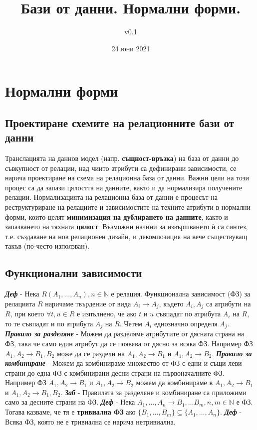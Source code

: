 \documentclass[fleqn,12pt]{article}
\title{Бази от данни. Нормални форми.}
\author{v0.1}
\date{24 юни 2021}
\begin{document}
\maketitle
\tableofcontents
\pagebreak


\section{Нормални форми}
\subsection{Проектиране схемите на релационните бази от данни}

Транслацията на даннов модел (напр. \textbf{същност-връзка}) на база от данни до съвкупност от релации, над чиито атрибути са дефинирани зависимости, се нарича проектиране на схема на релационна база от данни.
Важни цели на този процес са да запази цялостта на данните, както и да нормализира получените релации.
\bigbreak
Нормализацията на релационна база от данни е процесът на реструктуриране на релациите и зависимостите на техните атрибути в нормални форми, които целят \textbf{минимизация на дублирането на данните}, както и запазването на тяхната \textbf{цялост}.
Възможни начини за извършването ѝ са синтез, т.е. създаване на нов релационен дизайн, и декомпозиция на вече съществуващ такъв (по-често използван).

\subsection{Функционални зависимости}

\textbf{\textit{Деф}} - Нека $R(A_1, \dots, A_n), n \in \mathbb{N}$ е релация.
Функционална зависимост (ФЗ) за релацията $R$ наричаме твърдение от вида $A_i \rightarrow A_j$, където $A_i, A_j$ са атрибути на $R$, при което $\forall t, u \in R$ е изпълнено, че ако $t$ и $u$ съвпадат по атрибута $A_i$ на $R$, то те съвпадат и по атрибута $A_j$ на $R$.
Четем $A_i$ еднозначно определя $A_j$.
\bigbreak
\textbf{\textit{Правило за разделяне}} - Можем да разделяме атрибутите от дясната страна на ФЗ, така че само един атрибут да се появява от дясно за всяка ФЗ.
Например ФЗ $A_1, A_2 \rightarrow B_1, B_2$ може да се раздели на $A_1, A_2 \rightarrow B_1$ и $A_1, A_2 \rightarrow B_2$.
\bigbreak
\textbf{\textit{Правило за комбиниране}} - Можем да комбинираме множество от ФЗ с едни и същи леви страни до една ФЗ с комбинирани десни страни на първоначалните ФЗ.
Например ФЗ $A_1, A_2 \rightarrow B_1$ и $A_1, A_2 \rightarrow B_2$ можем да комбинираме в $A_1, A_2 \rightarrow B_1$ и $A_1, A_2 \rightarrow B_1, B_2$.
\bigbreak
\textbf{\textit{Заб}} - Правилата за разделяне и комбиниране са приложими само за десните страни на ФЗ.
\bigbreak
\textbf{\textit{Деф}} - Нека $A_1, \dots, A_n \rightarrow B_1, \dots B_m, n, m \in \mathbb{N}$ е ФЗ.
Тогава казваме, че тя е \textbf{тривиална ФЗ} ако $\{B_1, \dots, B_m\} \subseteq \{A_1, \dots, A_n\}$.
\bigbreak
\textbf{\textit{Деф}} - Всяка ФЗ, която не е тривиална се нарича нетривиална.
\end{document}
